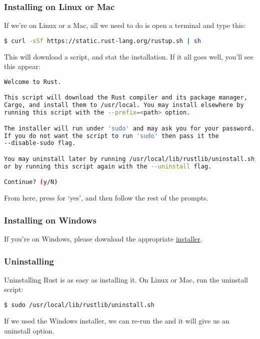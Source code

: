 \subsubsection*{Installing on Linux or Mac}

If we're on Linux or a Mac, all we need to do is open a terminal and type this:
\begin{lstlisting}[language=Bash]
$ curl -sSf https://static.rust-lang.org/rustup.sh | sh
\end{lstlisting}

This will download a script, and stat the installation. If it all goes well, you'll see this appear:
\begin{lstlisting}[language=Bash]
Welcome to Rust.

This script will download the Rust compiler and its package manager, 
Cargo, and install them to /usr/local. You may install elsewhere by 
running this script with the --prefix=<path> option.

The installer will run under 'sudo' and may ask you for your password. 
If you do not want the script to run 'sudo' then pass it the 
--disable-sudo flag.

You may uninstall later by running /usr/local/lib/rustlib/uninstall.sh,
or by running this script again with the --uninstall flag.

Continue? (y/N)
\end{lstlisting}
From here, press  for ‘yes’, and then follow the rest of the prompts.

\subsubsection*{Installing on Windows}

If you're on Windows, please download the appropriate \href{https://www.rust-lang.org/install.html}{installer}.

\subsubsection*{Uninstalling}

Uninstalling Rust is as easy as installing it. On Linux or Mac, run the uninstall script:

\begin{lstlisting}[language=Bash]
$ sudo /usr/local/lib/rustlib/uninstall.sh
\end{lstlisting}

If we used the Windows installer, we can re-run the  and it will give us an uninstall option.

